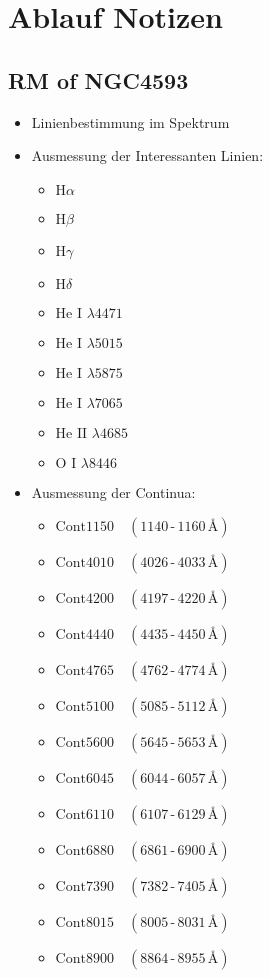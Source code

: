 \chapter{Ablauf Notizen}


\section{RM of NGC4593}
\begin{itemize}
	\item Linienbestimmung im Spektrum
	\item Ausmessung der Interessanten Linien:
	\begin{itemize}
		\item \(\text{H}\alpha\)
		\item \(\text{H}\beta\)
		\item \(\text{H}\gamma\)
		\item \(\text{H}\delta\)
		\item \(\text{He I } \lambda 4471\) 
		\item \(\text{He I } \lambda 5015\) 
		\item \(\text{He I } \lambda 5875\) 
		\item \(\text{He I } \lambda 7065\) 
		\item \(\text{He II } \lambda 4685\)
		\item \(\text{O I } \lambda 8446\)  
	\end{itemize}
	\item Ausmessung der Continua:
	\begin{itemize}
		\item $\mathrm{Cont1150} \quad (1140\,\text{-}\,1160\,\text{\AA})$
		\item $\mathrm{Cont4010} \quad (4026\,\text{-}\,4033\,\text{\AA})$
		\item $\mathrm{Cont4200} \quad (4197\,\text{-}\,4220\,\text{\AA})$
		\item $\mathrm{Cont4440} \quad (4435\,\text{-}\,4450\,\text{\AA})$
		\item $\mathrm{Cont4765} \quad (4762\,\text{-}\,4774\,\text{\AA})$
		\item $\mathrm{Cont5100} \quad (5085\,\text{-}\,5112\,\text{\AA})$
		\item $\mathrm{Cont5600} \quad (5645\,\text{-}\,5653\,\text{\AA})$
		\item $\mathrm{Cont6045} \quad (6044\,\text{-}\,6057\,\text{\AA})$
		\item $\mathrm{Cont6110} \quad (6107\,\text{-}\,6129\,\text{\AA})$
		\item $\mathrm{Cont6880} \quad (6861\,\text{-}\,6900\,\text{\AA})$
		\item $\mathrm{Cont7390} \quad (7382\,\text{-}\,7405\,\text{\AA})$
		\item $\mathrm{Cont8015} \quad (8005\,\text{-}\,8031\,\text{\AA})$
		\item $\mathrm{Cont8900} \quad (8864\,\text{-}\,8955\,\text{\AA})$
	\end{itemize}
\end{itemize}
